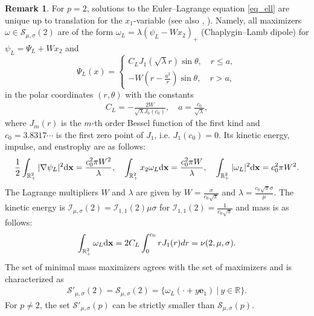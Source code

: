 \documentclass[11pt]{amsart}
\theoremstyle{definition}
\theoremstyle{definition}
\newtheorem{remark}[theorem]{Remark}
\numberwithin{equation}{section}
\newcommand{\0}{\emptyset}
\newcommand{\bfx}{{\bf x}}
\newcommand{\calI}{\mathcal I}
\newcommand{\calS}{\mathcal S}
\newcommand{\dd}{\mathrm{d}}
\begin{document}
			
			\begin{remark}\label{rmk_minmass_p}
				For $p=2$, solutions to the Euler--Lagrange equation \eqref{eq_ell} are unique up to translation for the $x_1$-variable \cite{Bur1996} (see also \cite{AC2022}, \cite{ACJ2025}). Namely, all maximizers $\omega\in \calS_{\mu,\sigma}(2)$ are of the form $\omega_{L}=\lambda (\psi_L-Wx_2)_{+}$ (Chaplygin--Lamb dipole) for $\psi_L=\Psi_{L}+Wx_2$ and 
				\begin{equation*}
					\Psi_{L}(x)=\left\{
					\begin{aligned}
						C_LJ_1(\sqrt{\lambda} r)\sin\theta,\quad r\leq a,\\
						-W\left(r-\frac{a^{2}}{r}\right)\sin\theta,\quad r>a,
					\end{aligned}
					\right. \label{eq: Lamb}
				\end{equation*}
				in the polar coordinates $(r,\theta)$ with the constants
				\begin{align*}
					C_L=-\frac{2W}{\sqrt{\lambda}J_0(c_0)},\quad a=\frac{c_0}{\sqrt{\lambda}},   \label{eq: LambConst}
				\end{align*}
				where $J_{m}(r)$ is the $m$-th order Bessel function of the first kind and $c_0=3.8317\cdots$ is the first zero point of $J_1$, i.e. $J_1(c_0)=0$. Its kinetic energy, impulse, and enstrophy are as follows:
				\begin{align*}
					\frac{1}{2}\int_{\mathbb{R}^{2}_{+}}|\nabla \psi_{L}|^{2}\dd\bfx=\frac{c_0^{2}\pi W^{2}}{\lambda},\quad
					\int_{\mathbb{R}^{2}_{+}}x_2 \omega_{L}\dd\bfx=\frac{c_0^{2}\pi W}{\lambda},\quad
					\int_{\mathbb{R}^{2}_{+}}| \omega_{L}|^{2}\dd\bfx=c_0^{2}\pi W^{2}. 
				\end{align*}
				The Lagrange multipliers $W$ and $\lambda$ are given by $W=\frac{\sigma}{c_0\sqrt{\pi}}$ and $\lambda =\frac{c_0\sqrt{\pi}\sigma}{\mu}$.
				The kinetic energy is $\calI_{\mu,\sigma}(2)=\calI_{1,1}(2)\mu \sigma$ for $\calI_{1,1}(2)=\frac{1}{c_0\sqrt{\pi}}$ and mass is as follows:
				\begin{align*}
					\int_{\mathbb{R}^{2}_{+}} \omega_{L}\dd\bfx=2C_L\int_{0}^{c_0}rJ_1(r)dr=\nu(2, \mu, \sigma).
				\end{align*}
				The set of minimal mass maximizers agrees with the set of maximizers and is characterized as 
				\begin{align*}
					\calS'_{\mu,\sigma}(2)=\calS_{\mu,\sigma}(2)=\{\omega_{L}(\cdot +y \mathbf{e}_1)\ |\ y\in \mathbb{R}\}.
				\end{align*}
				For $p\neq 2$, the set $\calS'_{\mu,\sigma}(p)$ can be strictly smaller than $\calS_{\mu,\sigma}(p)$.
			\end{remark}
			
\end{document}
